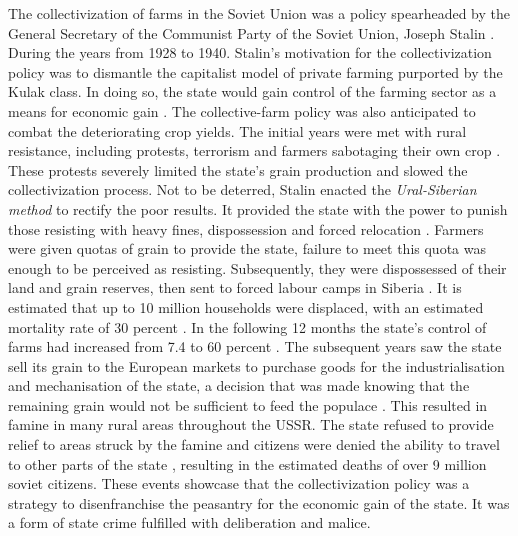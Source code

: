 \documentclass[12pt, a4paper,]{scrartcl}
\begin{document}
The collectivization of farms in the Soviet Union was a policy spearheaded by the General Secretary of the Communist Party of the Soviet Union, Joseph Stalin \cite{Hughes1994}. During the years from 1928 to 1940. Stalin's motivation for the collectivization policy was to dismantle the capitalist model of private farming purported by the Kulak class. In doing so, the state would gain control of the farming sector as a means for economic gain \cite{Hughes1994}. The collective-farm policy was also anticipated to combat the deteriorating crop yields. The initial years were met with rural resistance, including protests, terrorism and farmers sabotaging their own crop \cite{Marker1998}. These protests severely limited the state's grain production and slowed the collectivization process. Not to be deterred, Stalin enacted the \textit{Ural-Siberian method} to rectify the poor results. It provided the state with the power to punish those resisting with heavy fines, dispossession and forced relocation \cite{Hughes1994}. Farmers were given quotas of grain to provide the state, failure to meet this quota was enough to be perceived as resisting. Subsequently, they were dispossessed of their land and grain reserves, then sent to forced labour camps in Siberia \cite{Kalashnikov2018}. It is estimated that up to 10 million households were displaced, with an estimated mortality rate of 30 percent \cite{Khlevniuk2004}. In the following 12 months the state's control of farms had increased from 7.4 to 60 percent \cite{Khlevniuk2004}. The subsequent years saw the state sell its grain to the European markets to purchase goods for the industrialisation and mechanisation of the state, a decision that was made knowing that the remaining grain would not be sufficient to feed the populace \cite{Hughes1991}. This resulted in famine in many rural areas throughout the USSR. The state refused to provide relief to areas struck by the famine and citizens were denied the ability to travel to other parts of the state \cite{Livi-Bacci1993OnUnion}, resulting in the estimated deaths of over 9 million soviet citizens. These events showcase that the collectivization policy was a strategy to disenfranchise the peasantry for the economic gain of the state. It was a form of state crime fulfilled with deliberation and malice.
\par
\end{document}
